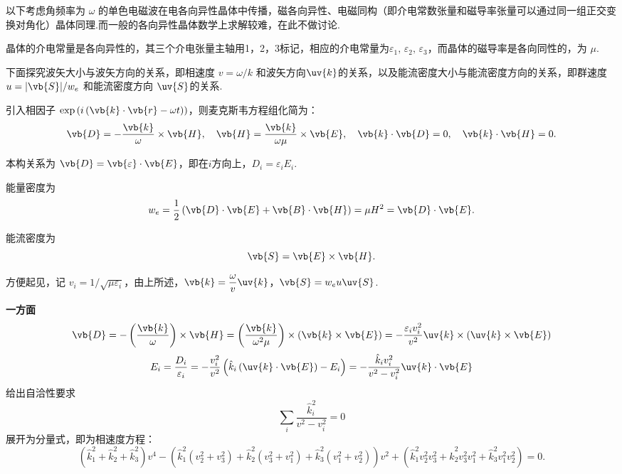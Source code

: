 以下考虑角频率为 \(\omega\) 的单色电磁波在电各向异性晶体中传播，磁各向异性、电磁同构（即介电常数张量和磁导率张量可以通过同一组正交变换对角化）晶体同理.而一般的各向异性晶体数学上求解较难，在此不做讨论.

晶体的介电常量是各向异性的，其三个介电张量主轴用1，2，3标记，相应的介电常量为\(\varepsilon_1,\,\varepsilon_2,\,\varepsilon_3\)，而晶体的磁导率是各向同性的，为 \(\mu\).

下面探究波矢大小与波矢方向的关系，即相速度 \(v = \omega/k\) 和波矢方向\(\uv{k}\)的关系，以及能流密度大小与能流密度方向的关系，即群速度 \(u = |\vb{S}|/w_e\) 和能流密度方向 \(\uv{S}\)的关系.

引入相因子 \(\exp\left(i\left(\vb{k} \cdot \vb{r} - \omega t\right)\right)\)，则麦克斯韦方程组化简为：
\begin{equation*}
	\vb{D} = -\dfrac{\vb{k}}{\omega}\times \vb{H}, \quad
	\vb{H} = \dfrac{\vb{k}}{\omega \mu} \times \vb{E}, \quad
	\vb{k} \cdot \vb{D} = 0, \quad
	\vb{k} \cdot \vb{H} = 0.
\end{equation*}

本构关系为 \(\vb{D} = \vb{\varepsilon} \cdot \vb{E}\)，即在\(i\)方向上，\(D_i = \varepsilon_i E_i\).

能量密度为
\begin{equation*}
	w_e = \dfrac{1}{2} \left( \vb{D} \cdot \vb{E} + \vb{B} \cdot \vb{H} \right) = \mu H^2 = \vb{D} \cdot \vb{E}.
\end{equation*}

能流密度为
\begin{equation*}
	\vb{S} = \vb{E} \times \vb{H}.
\end{equation*}

方便起见，记 \(v_i = 1/\sqrt{\mu \varepsilon_i}\)，由上所述，\(\vb{k} = \dfrac{\omega}{v} \uv{k}\)，\(\vb{S} = w_e u \uv{S}\).

\textbf{一方面}
\begin{equation*}
	\vb{D} = -\left( \dfrac{\vb{k}}{\omega} \right) \times \vb{H} = \left( \dfrac{\vb{k}}{\omega^2 \mu} \right) \times \left( \vb{k} \times \vb{E} \right) = -\dfrac{\varepsilon_i v_i^2}{v^2} \uv{k} \times \left( \uv{k} \times \vb{E} \right)
\end{equation*}
\begin{equation*}
	E_i =\frac{D_i}{\varepsilon_i}= -\dfrac{v_i^2}{v^2} \left(\hat{k}_i\left(\uv{k}\cdot\vb{E}\right)-E_i\right) = -\dfrac{\hat{k}_i v_i^2}{v^2 - v_i^2} \uv{k} \cdot \vb{E}
\end{equation*}
给出自洽性要求
\begin{equation*}
	\sum_i \dfrac{\hat{k}_i^2}{v^2 - v_i^2} = 0
\end{equation*}
展开为分量式，即为相速度方程：
\begin{equation*}
	\left(\hat{k}_1^2 + \hat{k}_2^2 + \hat{k}_3^2\right) v^4 - \left( \hat{k}_1^2 \left(v_2^2 + v_3^2\right) + \hat{k}_2^2 \left(v_3^2 + v_1^2\right) + \hat{k}_3^2 \left(v_1^2 + v_2^2\right) \right) v^2 + \left( \hat{k}_1^2 v_2^2 v_3^2 + \hat{k}_2^2 v_3^2 v_1^2 + \hat{k}_3^2 v_1^2 v_2^2 \right) = 0.
\end{equation*}

